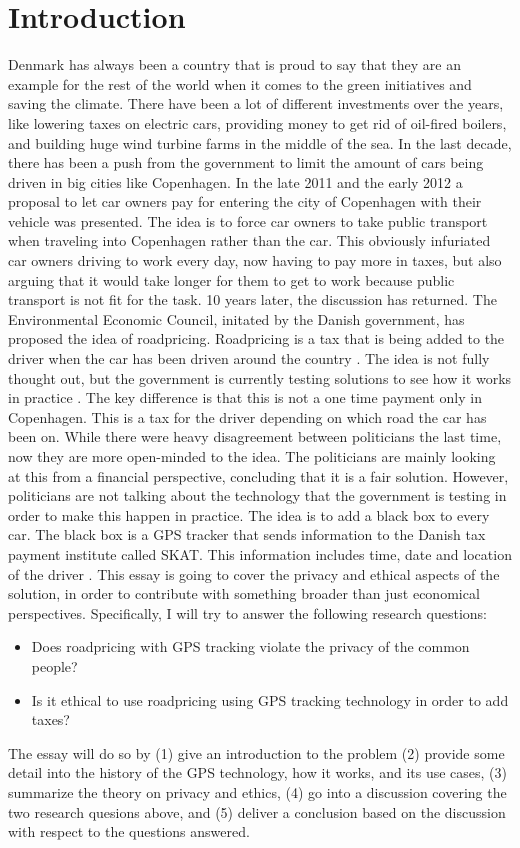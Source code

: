 \section{Introduction}
Denmark has always been a country that is proud to say that they are an example for the rest of the world when it comes to the green initiatives and saving the climate. There have been a lot of different investments over the years, like lowering taxes on electric cars, providing money to get rid of oil-fired boilers, and building huge wind turbine farms in the middle of the sea. In the last decade, there has been a push from the government to limit the amount of cars being driven in big cities like Copenhagen. In the late 2011 and the early 2012 a proposal to let car owners pay for entering the city of Copenhagen with their vehicle was presented. The idea is to force car owners to take public transport when traveling into Copenhagen rather than the car. This obviously infuriated car owners driving to work every day, now having to pay more in taxes, but also arguing that it would take longer for them to get to work because public transport is not fit for the task. 10 years later, the discussion has returned. The Environmental Economic Council, initated by the Danish government, has proposed the idea of roadpricing. Roadpricing is a tax that is being added to the driver when the car has been driven around the country \cite{borsen:2013}. The idea is not fully thought out, but the government is currently testing solutions to see how it works in practice \cite{kosmopol:2022}. The key difference is that this is not a one time payment only in Copenhagen. This is a tax for the driver depending on which road the car has been on. While there were heavy disagreement between politicians the last time, now they are more open-minded to the idea. The politicians are mainly looking at this from a financial perspective, concluding that it is a fair solution. However, politicians are not talking about the technology that the government is testing in order to make this happen in practice. The idea is to add a black box to every car. The black box is a GPS tracker that sends information to the Danish tax payment institute called SKAT. This information includes time, date and location of the driver \cite{jylland:2011}.
This essay is going to cover the privacy and ethical aspects of the solution, in order to contribute with something broader than just economical perspectives. Specifically, I will try to answer the following research questions:
\begin{itemize}
    \item Does roadpricing with GPS tracking violate the privacy of the common people?
    \item Is it ethical to use roadpricing using GPS tracking technology in order to add taxes?
\end{itemize}
The essay will do so by (1) give an introduction to the problem (2) provide some detail into the history of the GPS technology, how it works, and its use cases, (3) summarize the theory on privacy and ethics, (4) go into a discussion covering the two research quesions above, and (5) deliver a conclusion based on the discussion with respect to the questions answered.